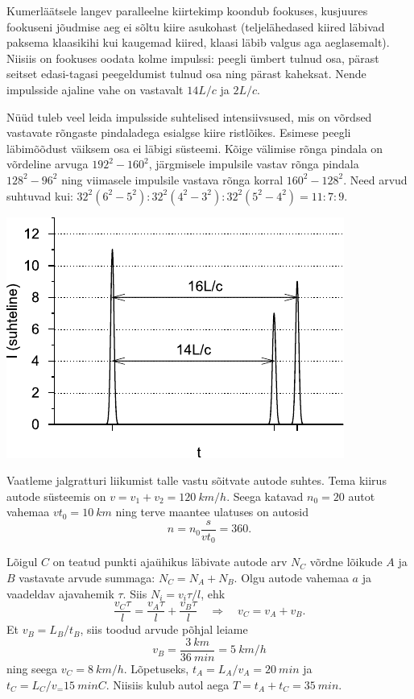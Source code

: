 \documentclass[10pt]{article}
\begin{document}
{Kumerläätsele langev paralleelne kiirtekimp koondub fookuses, kusjuures fookuseni jõudmise aeg ei sõltu kiire asukohast (teljelähedased kiired läbivad paksema klaasikihi kui kaugemad kiired, klaasi läbib valgus aga aeglasemalt). Niisiis on fookuses oodata kolme impulssi: peegli ümbert tulnud osa, pärast seitset edasi-tagasi peegeldumist tulnud osa ning pärast kaheksat. Nende impulsside ajaline vahe on vastavalt $14L/c$ ja $2L/c$.

Nüüd tuleb veel leida impulsside suhtelised intensiivsused, mis on võrdsed vastavate rõngaste pindaladega esialgse kiire ristlõikes. Esimese peegli läbimõõdust väiksem osa ei läbigi süsteemi. Kõige välimise rõnga pindala on võrdeline arvuga $192^2 - 160^2$, järgmisele impulsile vastav rõnga pindala $128^2 - 96^2$ ning viimasele impulsile vastava rõnga korral $160^2 - 128^2$. Need arvud suhtuvad kui: $32^2(6^2 - 5^2) : 32^2 (4^2 - 3^2) : 32^2 (5^2 - 4^2) = 11 : 7 : 9$.

\begin{center}
	\includegraphics[width=0.6\linewidth]{2006-v3g-09-lah}
\end{center}
\probend
\bigskip


\solu
Vaatleme jalgratturi liikumist talle vastu sõitvate autode suhtes. Tema kiirus autode süsteemis on $v = v_1 + v_2 = \SI{120}{km/h}$. Seega katavad $n_0 = 20$ autot vahemaa $vt_0 = \SI{10}{km}$ ning terve maantee ulatuses on autosid
\[
n = n_0 \frac{s}{vt_0} = \num{360}. 
\]
\probend
\bigskip


\solu
Lõigul $C$ on teatud punkti ajaühikus läbivate autode arv $N_C$ võrdne lõikude $A$ ja $B$ vastavate arvude summaga: $N_C = N_A + N_B$. Olgu autode vahemaa $a$ ja vaadeldav ajavahemik $\tau$. Siis $N_i = v_i\tau /l$, ehk 
\[
\frac{v_{C} \tau}{l}=\frac{v_{A} \tau}{l}+\frac{v_{B} \tau}{l} \quad \Rightarrow \quad v_{C}=v_{A}+v_{B}.
\]
Et $v_B = L_B/t_B$, siis toodud arvude põhjal leiame 
\[
v_{B}=\frac{\SI{3}{km}}{\SI{36}{min}}=\SI{5}{km/h}
\]
ning seega $v_C = \SI{8}{km/h}$. Lõpetuseks, $t_A = L_A/v_A=\SI{20}{min}$ ja $t_C = L_C/v_ = \SI{15}{min}C$. Niisiis kulub autol aega $T = t_A + t_C = \SI{35}{min}$.
\probend
\bigskip

}
\end{document}
